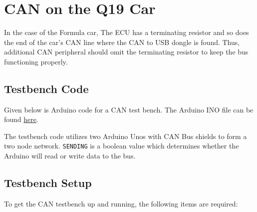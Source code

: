 \documentclass[letterpaper]{article}
\begin{document}
\section{CAN on the Q19 Car}
In the case of the Formula car, The ECU has a terminating resistor and so does
the end of the car's CAN line where the CAN to USB dongle is found. Thus,
additional CAN peripheral should omit the terminating resistor to keep the bus
functioning properly.

\subsection{Testbench Code}
Given below is Arduino code for a CAN test bench. The Arduino INO file can be
found
\href{https://github.com/bchampp/Q20/blob/master/CAN/testbench/testbench.ino}{here}.



\lstset{basicstyle=\ttfamily}

The testbench code utilizes two Arduino Unos with CAN Bus shields to form a
two node network. \lstinline{SENDING} is a boolean value which determines whether the
Arduino will read or write data to the bus.

\subsection{Testbench Setup}
\label{sec:setup}
To get the CAN testbench up and running, the following items are required:
\end{document}

